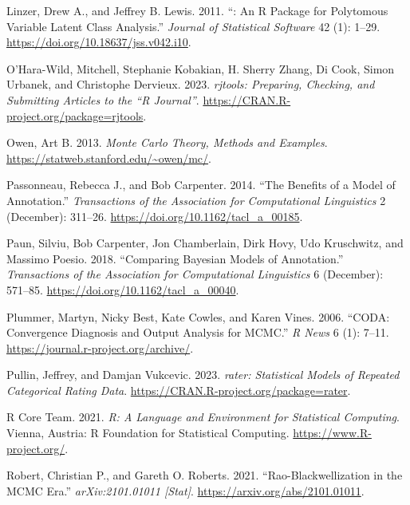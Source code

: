 \begin{CSLReferences}{1}{0}
\leavevmode{}%
Linzer, Drew A., and Jeffrey B. Lewis. 2011. {``: {An} {R} {Package} for {Polytomous} {Variable} {Latent} {Class} {Analysis}.''} \emph{Journal of Statistical Software} 42 (1): 1--29. \url{https://doi.org/10.18637/jss.v042.i10}.

\leavevmode{}%
O'Hara-Wild, Mitchell, Stephanie Kobakian, H. Sherry Zhang, Di Cook, Simon Urbanek, and Christophe Dervieux. 2023. \emph{{rjtools}: Preparing, Checking, and Submitting Articles to the {``{R Journal}''}}. \url{https://CRAN.R-project.org/package=rjtools}.

\leavevmode{}%
Owen, Art B. 2013. \emph{Monte {Carlo} Theory, Methods and Examples}. \url{https://statweb.stanford.edu/~owen/mc/}.

\leavevmode{}%
Passonneau, Rebecca J., and Bob Carpenter. 2014. {``The {Benefits} of a {Model} of {Annotation}.''} \emph{Transactions of the Association for Computational Linguistics} 2 (December): 311--26. \url{https://doi.org/10.1162/tacl_a_00185}.

\leavevmode{}%
Paun, Silviu, Bob Carpenter, Jon Chamberlain, Dirk Hovy, Udo Kruschwitz, and Massimo Poesio. 2018. {``Comparing {Bayesian} {Models} of {Annotation}.''} \emph{Transactions of the Association for Computational Linguistics} 6 (December): 571--85. \url{https://doi.org/10.1162/tacl_a_00040}.

\leavevmode{}%
Plummer, Martyn, Nicky Best, Kate Cowles, and Karen Vines. 2006. {``CODA: Convergence Diagnosis and Output Analysis for MCMC.''} \emph{R News} 6 (1): 7--11. \url{https://journal.r-project.org/archive/}.

\leavevmode{}%
Pullin, Jeffrey, and Damjan Vukcevic. 2023. \emph{{rater}: Statistical Models of Repeated Categorical Rating Data}. \url{https://CRAN.R-project.org/package=rater}.

\leavevmode{}%
R Core Team. 2021. \emph{R: A Language and Environment for Statistical Computing}. Vienna, Austria: R Foundation for Statistical Computing. \url{https://www.R-project.org/}.

\leavevmode{}%
Robert, Christian P., and Gareth O. Roberts. 2021. {``{R}ao-{B}lackwellization in the {MCMC} Era.''} \emph{arXiv:2101.01011 {[}Stat{]}}. \url{https://arxiv.org/abs/2101.01011}.


\end{CSLReferences}
